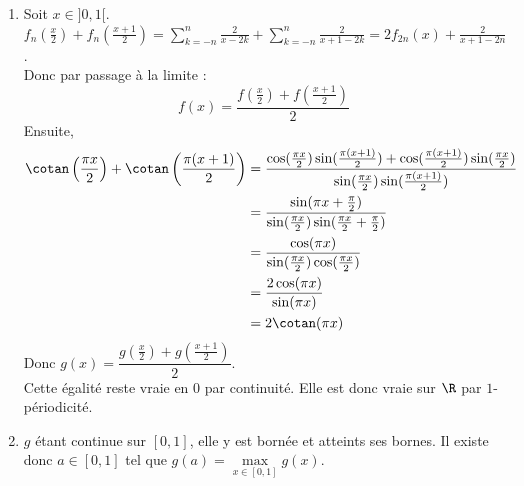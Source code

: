 \documentclass{book}
\begin{document}
\begin{enumerate}[leftmargin=*]
		Ainsi $\sup\limits_{x\in ]0,1[}|R_n(x)|\leq \dfrac{2}{n}\unfty\longrightarrow0$.\\
		Càd $(f_n)_{n\in \N}$ converge uniformément vers $f$ sur $]0,1[$. On en déduit que $f$ est continue sur $]0,1[$.\\
		Enfin, \begin{align*}
			\pi\cotan(\pi x)&\ =\frac{\pi\cos(\pi x)}{\sin(\pi x)}\\
			&\uxzero=\frac{1}{x-\frac{\pi^2x^3}{6}+\smallo{x^3}}\\
			&\uxzero=\frac{1}{x}\cdot\frac{1}{1-\frac{\pi^2x^2}{6}+\smallo{x^2}}\\
			&\uxzero=\frac{1}{x}\left(1-\frac{\pi^2x^2}{6}+\smallo{x^2}\right)\\
			&\uxzero=\frac{1}{x}-\frac{\pi^2x}{6}+\smallo{x}
		\end{align*}
		Donc $g(x)\uxzero=\displaystyle-\frac{\pi^2x}{6}+\sum_{k=1}^{+\infty}\frac{2x}{k^2-x^2}+\smallo{x}\uxzero=\smallo{1}$.\\
		Càd $g$ est prolongeable par continuité en $0$ en posant $g(0)=0$. Par $1$-périodicité, $g$ est prolongeable par continuité sur $\R$ en posant $g(k)=0$ pour tout entier $k$.
		\item Soit $x\in ]0,1[$.\\
		$f_n\left(\frac{x}{2}\right)+f_n\left(\frac{x+1}{2}\right)=\displaystyle\sum_{k=-n}^n\frac{2}{x-2k}+\sum_{k=-n}^n\frac{2}{x+1-2k}=2f_{2n}(x)+\frac{2}{x+1-2n}$.\\
		Donc par passage à la limite :
		$$f(x)=\frac{f\left(\frac{x}{2}\right)+f\left(\frac{x+1}{2}\right)}{2}$$
		Ensuite,\begin{align*}
			\cotan\left(\frac{\pi x}{2}\right)+\cotan\left(\frac{\pi(x+1)}{2}\right)&=\frac{\cos(\frac{\pi x}{2})\sin(\frac{\pi(x+1)}{2})+\cos(\frac{\pi(x+1)}{2})\sin(\frac{\pi x}{2})}{\sin(\frac{\pi x}{2})\sin(\frac{\pi(x+1)}{2})}\\
			&=\frac{\sin(\pi x+\frac{\pi}{2})}{\sin(\frac{\pi x}{2})\sin(\frac{\pi x}{2}+\frac{\pi}{2})}\\
			&=\frac{\cos(\pi x)}{\sin(\frac{\pi x}{2})\cos(\frac{\pi x}{2})}\\
			&=\frac{2\cos(\pi x)}{\sin(\pi x)}\\
			&=2\cotan(\pi x)
		\end{align*}
		Donc $g(x)=\dfrac{g\left(\frac{x}{2}\right)+g\left(\frac{x+1}{2}\right)}{2}$.\\
		Cette égalité reste vraie en $0$ par continuité. Elle est donc vraie sur $\R$ par $1$-périodicité.
		\item $g$ étant continue sur $[0,1]$, elle y est bornée et atteints ses bornes. Il existe donc $a\in [0,1]$ tel que $g(a)=\max\limits_{x\in [0,1]}g(x)$.\\

\end{enumerate}
\end{document}

